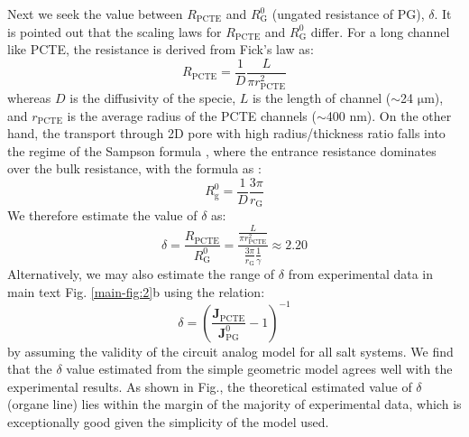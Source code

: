 \documentclass[manuscript=suppinfo,email=true, hyperref=true, keywords=false]{achemso}
\newcommand{\Fig}{Fig.}
\begin{document}
Next we seek the value between $R_{\mathrm{PCTE}}$ and
$R_{\mathrm{G}}^{0}$ (ungated resistance of PG), $\delta$. It is
pointed out that the scaling laws for $R_{\mathrm{PCTE}}$ and
$R_{\mathrm{G}}^{0}$ differ. For a long channel like PCTE, the
resistance is derived from Fick's law as\cite{O_Hern_2014}:
\begin{equation}
\label{eq:R-PCTE}
 R_{\mathrm{PCTE}} = \frac{1}{D} \frac{L}{\pi r_{\mathrm{PCTE}}^{2}}
\end{equation}
whereas $D$ is the diffusivity of the specie, $L$ is the length of
channel ($\sim$24 $\mathrm{\mu}$m), and $r_{\mathrm{PCTE}}$ is the
average radius of the PCTE channels ($\sim$400 nm). On the other hand,
the transport through 2D pore with high radius/thickness ratio falls
into the regime of the Sampson formula \cite{Roscoe_1949}, where the
entrance resistance dominates over the bulk resistance, with the
formula as \cite{Roscoe_1949,Celebi_2014}:
\begin{equation}
  \label{eq:sampson}
  R_{\mathrm{g}}^{0} = \frac{1}{D} \frac{3 \pi}{r_{\mathrm{G}}}
\end{equation}
We therefore estimate the value of $\delta$ as:
\begin{equation}
  \label{eq:delta-resistance}
  \delta
  = \frac{R_{\mathrm{PCTE}}}{R_{\mathrm{G}}^{0}}
  = {\displaystyle
    \frac{{\displaystyle \frac{L}
        {\pi r_{\mathrm{PCTE}}^{2}}}}
    {{\displaystyle \frac{3 \pi}{r_{\mathrm{G}}} \frac{1}{\gamma}}}}
  \approx 2.20
\end{equation}
Alternatively, we may also estimate the range of $\delta$ from
experimental data in main text \Fig{} \ref{main-fig:2}b using the
relation:
\begin{equation}
  \label{eq:exp-delta}
  \delta = \left(\frac{\boldsymbol{J}_{\mathrm{PCTE}}}{\boldsymbol{J}_{\mathrm{PG}}^{0}} -1 \right)^{-1}
\end{equation}
by assuming the validity of the circuit analog model for all salt
systems. We find that the $\delta$ value estimated from the simple
geometric model agrees well with the experimental results. As shown in
\Fig{}, the theoretical estimated value of $\delta$ (organe line) lies
within the margin of the majority of experimental data, which is
exceptionally good given the simplicity of the model used.
\end{document}
